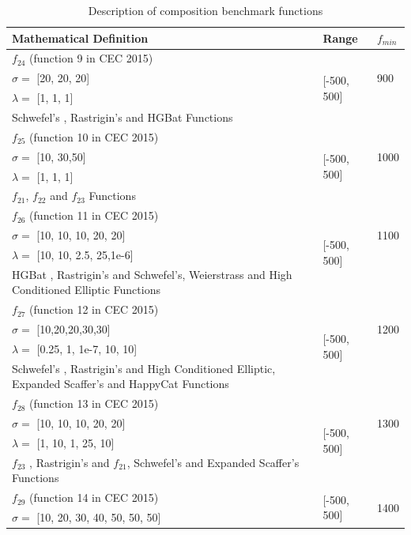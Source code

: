 \documentclass[a4paper,13pt,2p]{report}
\begin{document}
\begin{table}[!t]
\caption{Description of composition benchmark functions}
\label{tbl_compos_funcs}
\centering
\begin{tabular}{p{9cm} p{2cm} p{1cm}}
 \hline Mathematical Definition & Range & $f_{min}$  \\ 
 \hline
$f_{24}$ (function 9 in CEC 2015) & \multirow{4}{*}{[-500, 500]} & \multirow{3}{*}{900} \\
$\sigma = $ [20, 20, 20] & \\
$\lambda = $ [1, 1, 1] & \\
Schwefel's , Rastrigin's  and  HGBat  Functions & \\ \hline
$f_{25}$ (function 10 in CEC 2015) & \multirow{4}{*}{[-500, 500]} & \multirow{3}{*}{1000} \\
$\sigma = $  [10, 30,50]  & \\
$\lambda = $  [1, 1, 1]  & \\
$f_{21}$, $f_{22}$ and $f_{23}$ Functions & \\ \hline
$f_{26}$ (function 11 in CEC 2015) & \multirow{4}{*}{[-500, 500]} & \multirow{3}{*}{1100} \\
$\sigma = $  [10, 10, 10, 20, 20]  & \\
$\lambda = $  [10, 10, 2.5, 25,1e-6]  & \\
 HGBat ,  Rastrigin’s  and   Schwefel's,  Weierstrass and  High Conditioned Elliptic   Functions & \\ \hline
$f_{27}$ (function 12 in CEC 2015) & \multirow{4}{*}{[-500, 500]} & \multirow{3}{*}{1200} \\
$\sigma = $  [10,20,20,30,30] & \\
$\lambda = $ [0.25, 1, 1e-7, 10, 10]  & \\
 Schwefel's  , Rastrigin's  and   High Conditioned Elliptic, Expanded Scaffer’s and  HappyCat Functions & \\ \hline
$f_{28}$ (function 13 in CEC 2015) & \multirow{4}{*}{[-500, 500]} & \multirow{3}{*}{1300} \\
$\sigma = $  [10, 10, 10, 20, 20]  & \\
$\lambda = $  [1, 10, 1, 25, 10]  & \\
$f_{23}$ , Rastrigin's  and  $f_{21}$,  Schwefel's  and  Expanded Scaffer’s  Functions & \\ \hline
$f_{29}$ (function 14 in CEC 2015) & \multirow{4}{*}{[-500, 500]} & \multirow{3}{*}{1400} \\
$\sigma = $  [10, 20, 30, 40, 50, 50, 50] & \\

\end{tabular}
\end{table}
\end{document}
